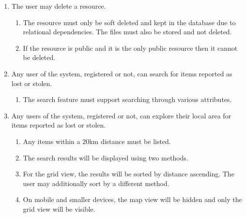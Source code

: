 \begin{enumerate}[label=\textbf{F\arabic*}]
\item The user may delete a resource.
	\begin{enumerate}[leftmargin=0.75in]
		\item The resource must only be soft deleted and kept in the database due to relational dependencies. The files must also be stored and not deleted.
		\item If the resource is public and it is the only public resource then it cannot be deleted.
	\end{enumerate}
\item Any user of the system, registered or not, can search for items reported as lost or stolen.
	\begin{enumerate}[leftmargin=0.75in]
		\item The search feature must support searching through various attributes.
	\end{enumerate}
\item Any users of the system, registered or not, can explore their local area for items reported as lost or stolen.
	\begin{enumerate}[leftmargin=0.75in]
		\item Any items within a 20km distance must be listed.
		\item The search results will be displayed using two methods.
		\item For the grid view, the results will be sorted by distance ascending. The user may additionally sort by a different method.
		\item On mobile and smaller devices, the map view will be hidden and only the grid view will be visible.	 
	\end{enumerate}

\end{enumerate}

